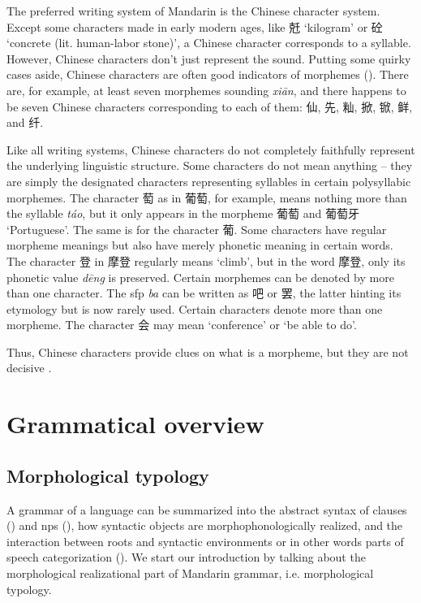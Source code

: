 \documentclass[UTF8, a4paper, oneside, scheme=plain, 12pt]{ctexrep}
\newcommand{\form}[1]{\emph{#1}}
\newcommand{\translate}[1]{`#1'}
\begin{document}
The preferred writing system of Mandarin is the Chinese character system.
Except some characters made in early modern ages,
like 兛 \translate{kilogram} or 砼 \translate{concrete (lit. human-labor stone)},
a Chinese character corresponds to a syllable.
However, Chinese characters don't just represent the sound.
Putting some quirky cases aside,
Chinese characters are often good indicators of morphemes
().
There are, for example, at least seven morphemes sounding \form{xi\={a}n},
and there happens to be seven Chinese characters corresponding to each of them:
仙, 先, 籼, 掀, 锨, 鲜, and 纤.

Like all writing systems, 
Chinese characters do not completely faithfully represent 
the underlying linguistic structure.
Some characters do not mean anything -- 
they are simply the designated characters representing syllables 
in certain polysyllabic morphemes.
The character 萄 as in 葡萄, for example, 
means nothing more than the syllable \form{t\'{a}o},
but it only appears in the morpheme 葡萄 and 葡萄牙 \translate{Portuguese}.
The same is for the character 葡.
Some characters have regular morpheme meanings
but also have merely phonetic meaning in certain words.
The character 登 in 摩登 regularly means \translate{climb},
but in the word 摩登, only its phonetic value \form{d\={e}ng} is preserved.
Certain morphemes can be denoted by more than one character.
The \ac{sfp} \form{ba} can be written as 吧 or 罢,
the latter hinting its etymology but is now rarely used.
Certain characters denote more than one morpheme.
The character 会 may mean \translate{conference} or \translate{be able to do}. 

Thus, Chinese characters provide clues on what is a morpheme,
but they are not decisive \citep[1.1.4]{zhudexigrammar}.


\chapter{Grammatical overview}

\section{Morphological typology}

A grammar of a language can be summarized into the abstract syntax of clauses () and \acp{np} (),
how syntactic objects are morphophonologically realized,
and the interaction between roots and syntactic environments
or in other words parts of speech categorization
().
We start our introduction by talking about the morphological realizational part of Mandarin grammar,
i.e. morphological typology.
\end{document}
